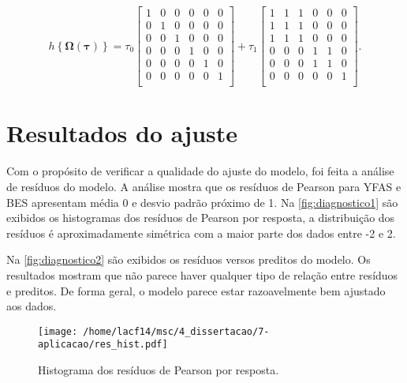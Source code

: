 \begin{equation}
h\left \{ \boldsymbol{\Omega}(\boldsymbol{\tau}) \right \} = 
\tau_0 \begin{bmatrix}
1 & 0 & 0 & 0 & 0 & 0\\ 
0 & 1 & 0 & 0 & 0 & 0\\ 
0 & 0 & 1 & 0 & 0 & 0\\ 
0 & 0 & 0 & 1 & 0 & 0\\ 
0 & 0 & 0 & 0 & 1 & 0\\ 
0 & 0 & 0 & 0 & 0 & 1\\ 
\end{bmatrix} + 
\tau_1 \begin{bmatrix}
1 & 1 & 1 & 0 & 0 & 0\\ 
1 & 1 & 1 & 0 & 0 & 0\\ 
1 & 1 & 1 & 0 & 0 & 0\\ 
0 & 0 & 0 & 1 & 1 & 0\\ 
0 & 0 & 0 & 1 & 1 & 0\\ 
0 & 0 & 0 & 0 & 0 & 1\\ 
\end{bmatrix}.
\end{equation}


\section{Resultados do ajuste}

Com o propósito de verificar a qualidade do ajuste do modelo, foi feita a análise de resíduos do modelo. A análise mostra que os resíduos de Pearson para YFAS e BES apresentam média 0 e desvio padrão próximo de 1. Na \autoref{fig:diagnostico1} são exibidos os histogramas dos resíduos de Pearson por resposta, a distribuição dos resíduos é aproximadamente simétrica com a maior parte dos dados entre -2 e 2.

Na \autoref{fig:diagnostico2} são exibidos os resíduos versos preditos do modelo. Os resultados mostram que não parece haver qualquer tipo de relação entre resíduos e preditos. De forma geral, o modelo parece estar razoavelmente bem ajustado aos dados.

\begin{figure}[H]
\centering
\texttt{[image: /home/lacf14/msc/4\_dissertacao/7-aplicacao/res\_hist.pdf]}
\caption{Histograma dos resíduos de Pearson por resposta.}
\label{fig:diagnostico1}
\end{figure}

